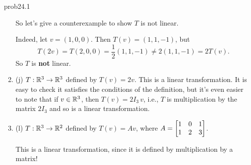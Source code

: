 \begin{sol}{prob24.1}
\begin{enumerate}[]
So let's give a counterexample to show $T$ is not linear.

Indeed, let $v=(1,0,0)$. Then $T(v)=(1,1,-1)$, but $$T(2v)=T(2,0,0)=\dfrac12 (1,1,-1)\not= 2 (1,1,-1)=2 T(v).$$ So $T$ is {\bf not} linear.
\medskip
%


\item (j) $T:\mathbb{R}^3 \to \mathbb{R}^3$ defined by $T(v)= 2 v$.
\soln This is a linear transformation. It is easy to check it satisfies the conditions of the definition, but it's even easier to note that if $v\in \mathbb{R}^3$, then $T(v)=2I_3\, v$, i.e., $T$ is multiplication by the matrix $2I_3$ and so is a linear transformation. 
\medskip
%


\item (l) $T:\mathbb{R}^3 \to \mathbb{R}^2$ defined by $T(v)= Av$, where $A=\bmatrix 1&0&1\\ 1&2&3\endbmatrix$.

\soln This is a linear transformation, since it is defined by multiplication by a matrix!
\medskip

\end{enumerate} 

\end{sol}

